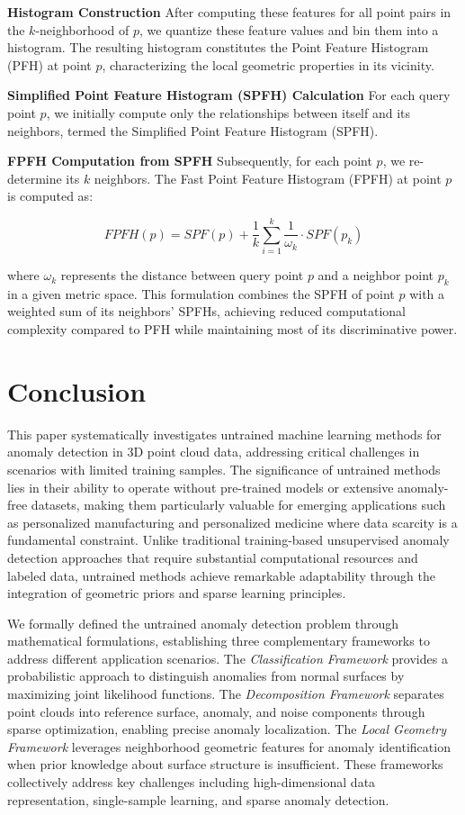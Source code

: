 \textbf{Histogram Construction}
After computing these features for all point pairs in the $k$-neighborhood of $p$, we quantize these feature values and bin them into a histogram. The resulting histogram constitutes the Point Feature Histogram (PFH) at point $p$, characterizing the local geometric properties in its vicinity.

\textbf{Simplified Point Feature Histogram (SPFH) Calculation}
For each query point $p$, we initially compute only the relationships between itself and its neighbors, termed the Simplified Point Feature Histogram (SPFH).

\textbf{FPFH Computation from SPFH}
Subsequently, for each point $p$, we re-determine its $k$ neighbors. The Fast Point Feature Histogram (FPFH) at point $p$ is computed as:

\begin{equation}
FPFH(p) = SPF(p) + \frac{1}{k}\sum_{i=1}^{k}\frac{1}{\omega_k} \cdot SPF(p_k)
\end{equation}

\noindent
where $\omega_k$ represents the distance between query point $p$ and a neighbor point $p_k$ in a given metric space. This formulation combines the SPFH of point $p$ with a weighted sum of its neighbors' SPFHs, achieving reduced computational complexity compared to PFH while maintaining most of its discriminative power.

\section{Conclusion}
\label{sec:conclusion}

This paper systematically investigates untrained machine learning methods for anomaly detection in 3D point cloud data, addressing critical challenges in scenarios with limited training samples. The significance of untrained methods lies in their ability to operate without pre-trained models or extensive anomaly-free datasets, making them particularly valuable for emerging applications such as personalized manufacturing and personalized medicine where data scarcity is a fundamental constraint. Unlike traditional training-based unsupervised anomaly detection approaches that require substantial computational resources and labeled data, untrained methods achieve remarkable adaptability through the integration of geometric priors and sparse learning principles.

We formally defined the untrained anomaly detection problem through  mathematical formulations, establishing three complementary frameworks to address different application scenarios. The \textit{Classification Framework} provides a probabilistic approach to distinguish anomalies from normal surfaces by maximizing joint likelihood functions. The \textit{Decomposition Framework} separates point clouds into reference surface, anomaly, and noise components through sparse optimization, enabling precise anomaly localization. The \textit{Local Geometry Framework} leverages neighborhood geometric features for anomaly identification when prior knowledge about surface structure is insufficient. These frameworks collectively address key challenges including high-dimensional data representation, single-sample learning, and sparse anomaly detection.

